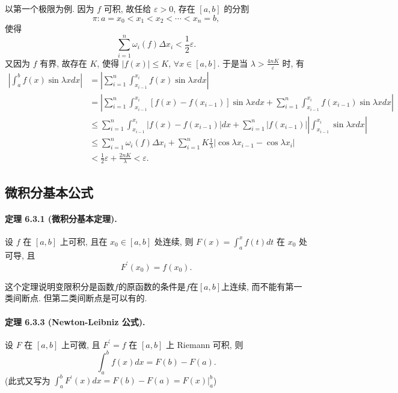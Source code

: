 以第一个极限为例. 因为 $f$ 可积, 故任给 $\varepsilon>0$, 存在 $[a,b]$ 的分割 
\[
\pi:a=x_{0}<x_{1}<x_{2}<\cdots<x_{n}=b,
\]
使得 
\[
\sum_{i=1}^{n}\omega_{i}(f)\Delta x_{i}<\frac{1}{2}\varepsilon.
\]
又因为 $f$ 有界, 故存在 $K$, 使得 $|f(x)|\leqslant K$, $\forall x\in[a,b]$.
于是当 $\lambda>\frac{4nK}{\varepsilon}$ 时, 有 
\[
\begin{aligned}\left|\int_{a}^{b}f(x)\sin\lambda xdx\right| & =\left|\sum_{i=1}^{n}\int_{x_{i-1}}^{x_{i}}f(x)\sin\lambda xdx\right|\\
 & =\left|\sum_{i=1}^{n}\int_{x_{i-1}}^{x_{i}}\left[f(x)-f\left(x_{i-1}\right)\right]\sin\lambda xdx+\sum_{i=1}^{n}\int_{x_{i-1}}^{x_{i}}f\left(x_{i-1}\right)\sin\lambda xdx\right|\\
 & \leqslant\sum_{i=1}^{n}\int_{x_{i-1}}^{x_{i}}\left|f(x)-f\left(x_{i-1}\right)\right|dx+\sum_{i=1}^{n}\left|f\left(x_{i-1}\right)\right|\left|\int_{x_{i-1}}^{x_{i}}\sin\lambda xdx\right|\\
 & \leqslant\sum_{i=1}^{n}\omega_{i}(f)\Delta x_{i}+\sum_{i=1}^{n}K\frac{1}{\lambda}\left|\cos\lambda x_{i-1}-\cos\lambda x_{i}\right|\\
 & <\frac{1}{2}\varepsilon+\frac{2nK}{\lambda}<\varepsilon.
\end{aligned}
\]


\subsection{微积分基本公式}

\paragraph{定理 6.3.1 (微积分基本定理). }

设 $f$ 在 $[a,b]$ 上可积, 且在 $x_{0}\in[a,b]$ 处连续, 则 $F(x)=\int_{a}^{x}f(t)dt$
在 $x_{0}$ 处可导, 且 
\[
F^{\prime}\left(x_{0}\right)=f\left(x_{0}\right).
\]

这个定理说明变限积分是函数$f$的原函数的条件是$f$在$[a,b]$上连续, 而不能有第一类间断点. 但第二类间断点是可以有的.

\paragraph{定理 6.3.3 (Newton-Leibniz 公式). }

设 $F$ 在 $[a,b]$ 上可微, 且 $F^{\prime}=f$ 在 $[a,b]$ 上 Riemann 可积,
则 
\[
\int_{a}^{b}f(x)dx=F(b)-F(a).
\]
(此式又写为 $\int_{a}^{b}F^{\prime}(x)dx=F(b)-F(a)=\left.F(x)\right|_{a}^{b}$)

